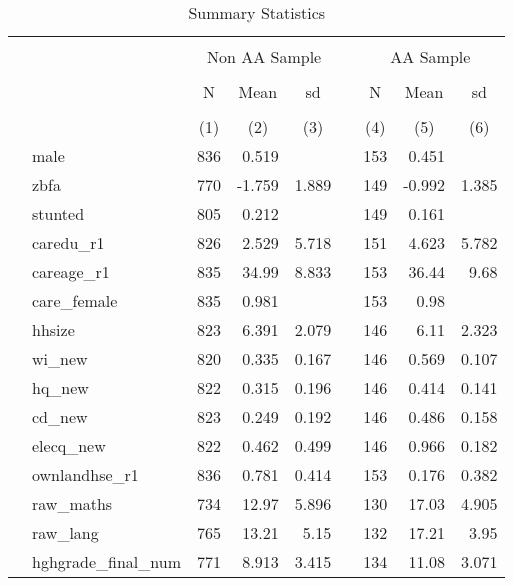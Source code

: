 \begin{table}[ht]
\centering
\caption{Summary Statistics} 
\label{tab:01}
\begin{tabular}{llrrrlrrr}
  \toprule
   \\[-1.8ex]  & & \multicolumn{3}{c}{Non AA Sample} & & \multicolumn{3}{c}{AA Sample}  \\[0.2ex] \cline{3-5}  \cline{7-9}  \\[-1.2ex]  & & \multicolumn{1}{c}{N} & \multicolumn{1}{c}{Mean} & \multicolumn{1}{c}{sd} & & \multicolumn{1}{c}{N} & \multicolumn{1}{c}{Mean} & \multicolumn{1}{c}{sd} \\  \\[-1.8ex] &  & \multicolumn{1}{c}{(1)} & \multicolumn{1}{c}{(2)} & \multicolumn{1}{c}{(3)} & & 
  \multicolumn{1}{c}{(4)} & \multicolumn{1}{c}{(5)} & \multicolumn{1}{c}{(6)} \\  \midrule
 & male &   836 & 0.519 &  &  &   153 & 0.451 &  \\ 
   & zbfa &   770 & -1.759 & 1.889 &  &   149 & -0.992 & 1.385 \\ 
   & stunted &   805 & 0.212 &  &  &   149 & 0.161 &  \\ 
   & caredu\_r1 &   826 & 2.529 & 5.718 &  &   151 & 4.623 & 5.782 \\ 
   & careage\_r1 &   835 & 34.99 & 8.833 &  &   153 & 36.44 &  9.68 \\ 
   & care\_female &   835 & 0.981 &  &  &   153 &  0.98 &  \\ 
   & hhsize &   823 & 6.391 & 2.079 &  &   146 &  6.11 & 2.323 \\ 
   & wi\_new &   820 & 0.335 & 0.167 &  &   146 & 0.569 & 0.107 \\ 
   & hq\_new &   822 & 0.315 & 0.196 &  &   146 & 0.414 & 0.141 \\ 
   & cd\_new &   823 & 0.249 & 0.192 &  &   146 & 0.486 & 0.158 \\ 
   & elecq\_new &   822 & 0.462 & 0.499 &  &   146 & 0.966 & 0.182 \\ 
   & ownlandhse\_r1 &   836 & 0.781 & 0.414 &  &   153 & 0.176 & 0.382 \\ 
   & raw\_maths &   734 & 12.97 & 5.896 &  &   130 & 17.03 & 4.905 \\ 
   & raw\_lang &   765 & 13.21 &  5.15 &  &   132 & 17.21 &  3.95 \\ 
   & hghgrade\_final\_num &   771 & 8.913 & 3.415 &  &   134 & 11.08 & 3.071 \\ 

\end{tabular}
\end{table}
